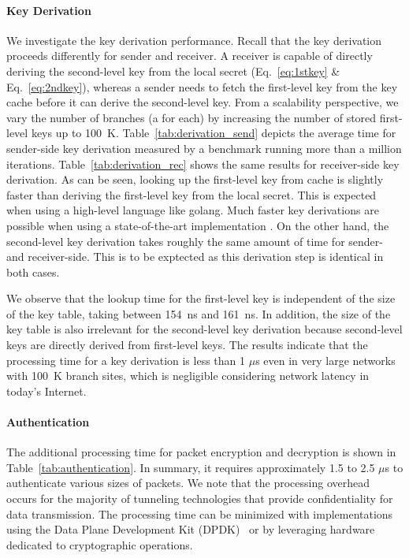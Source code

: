 \paragraph{Key Derivation}
We investigate the key derivation performance. Recall that the key derivation proceeds
differently for sender and receiver. A receiver is capable of directly deriving the
second-level key from the local secret (Eq.~\ref{eq:1stkey} \& Eq.~\ref{eq:2ndkey}),
whereas a sender needs to fetch the first-level key from the key cache before it can derive the second-level key.
From a scalability perspective, we vary the number of branches (a \tp for each) by increasing the number of stored
first-level keys up to \SI{100}{K}. Table~\ref{tab:derivation_send} depicts the average time for sender-side key derivation
measured by a benchmark running more than a million iterations. Table~\ref{tab:derivation_rec} shows the same results for
receiver-side key derivation. As can be seen, looking up the first-level key from cache is slightly faster than
deriving the first-level key from the local secret. This is expected when using a high-level language like golang.
Much faster key derivations are possible when using a state-of-the-art implementation \cite{rot2020piskes}.
On the other hand, the second-level key derivation takes roughly the same amount of time for sender- and receiver-side.
This is to be exptected as this derivation step is identical in both cases.

We observe that the lookup time for the first-level key is independent of the size of the key
table, taking between \SI{154}{ns} and \SI{161}{ns}. In addition, the size of the key table is
also irrelevant for the second-level key derivation
because second-level keys are directly derived from first-level keys.
The results indicate that the processing time for a key derivation is less than 1 $\mu$s
even in very large networks with \SI{100}{K} branch sites, which is negligible considering
network latency in today's Internet.

\paragraph{Authentication}
The additional processing time for packet encryption and decryption is shown in
Table~\ref{tab:authentication}. In summary, it requires approximately 1.5 to 2.5 $\mu$s to
authenticate various sizes of packets. We note that the processing overhead occurs for the majority
of tunneling technologies that provide confidentiality for data transmission. The processing
time can be minimized with implementations using the Data Plane Development Kit
(DPDK)~\cite{dpdk} or by leveraging hardware dedicated to cryptographic
operations.

